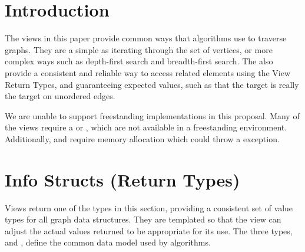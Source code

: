 
\clearpage

\section{Introduction}






%
%

The views in this paper provide common ways that algorithms use to traverse graphs. They are a simple as iterating 
through the set of vertices, or more complex ways such as depth-first search and breadth-first search. The also 
provide a consistent and reliable way to access related elements using the View Return Types, and guaranteeing expected 
values, such as that the target is really the target on unordered edges.

We are unable to support freestanding implementations in this proposal. Many of the
views require a  or , which are not available in a freestanding environment. 
Additionally,  and  require memory allocation which could throw a  
exception. 

\section{Info Structs (Return Types)}
Views return one of the types in this section, providing a consistent set of value types for all graph data structures. 
They are templated so that the view can adjust the actual values returned to be appropriate for its use. The three types, 
 and , define the common data model used by algorithms.

